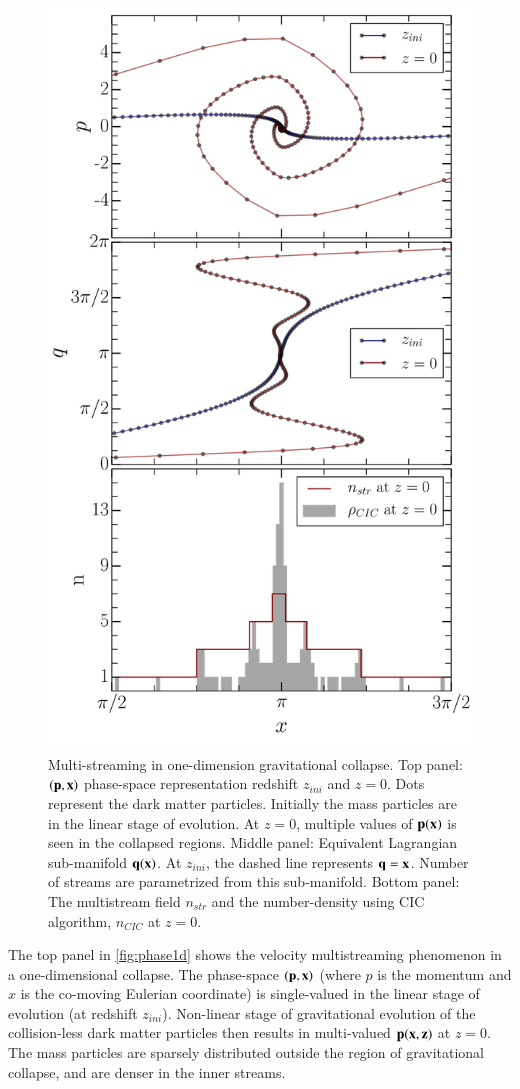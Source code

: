 \begin{figure}
\begin{minipage}[t]{.99\linewidth}
  \centering\includegraphics[width=8.cm]{Chapter4/Source_v2/fig13.pdf} 
\end{minipage}\hfill
\caption{ Multi-streaming in one-dimension gravitational collapse. Top panel: $(\bf{p}, \bf{x})$ phase-space representation redshift $z_{ini}$ and $z = 0$. Dots represent the dark matter particles. Initially the mass particles are in the linear stage of evolution. At $z = 0$, multiple values of $\bf{p}(\bf{x})$ is seen in the collapsed regions. Middle panel: Equivalent Lagrangian sub-manifold $\bf{q}(\bf{x})$. At $z_{ini}$, the dashed line represents $\bf{q} = \bf{x}$. Number of streams are parametrized from this sub-manifold. Bottom panel: The multistream field $n_{str}$ and the number-density using CIC algorithm, $n_{CIC}$ at $z = 0$. }
\label{fig:phase1d}
\end{figure}

The top panel in \autoref{fig:phase1d} shows the velocity multistreaming phenomenon in a one-dimensional collapse. The phase-space $(\bf{p}, \bf{x})$ (where $p$ is the momentum and $x$ is the co-moving Eulerian coordinate) is single-valued in the linear stage of evolution (at redshift $z_{ini}$). Non-linear stage of gravitational evolution of the collision-less dark matter particles then results in multi-valued $\bf{p} (\bf{x},z)$ at $z = 0$. The mass particles are sparsely  distributed outside the region of gravitational collapse, and are denser in the inner streams.

